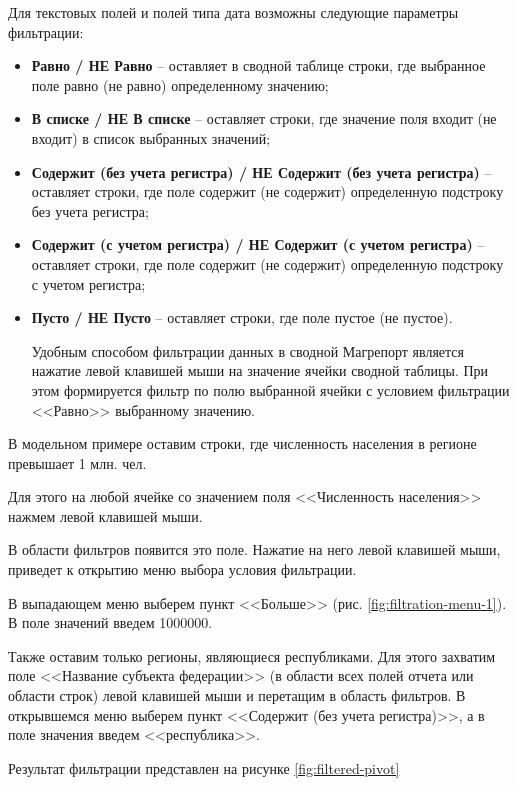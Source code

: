 \documentclass[../user-manual.tex]{subfiles}
\begin{document}
	Для текстовых полей и полей типа дата возможны следующие параметры фильтрации:
	
	\begin{itemize}
		
		\item \textbf{Равно / НЕ Равно} -- оставляет в сводной таблице строки, где выбранное поле равно (не равно) определенному значению;
		
		\item \textbf{В списке / НЕ В списке} -- оставляет строки, где значение поля входит (не входит) в список выбранных значений;
		
		\item \textbf{Содержит (без учета регистра) / НЕ Содержит (без учета регистра)} -- оставляет строки, где поле содержит (не содержит) определенную подстроку без учета регистра;
		
		\item \textbf{Содержит (с учетом регистра) / НЕ Содержит (с учетом регистра)} -- оставляет строки, где поле содержит (не содержит) определенную подстроку с учетом регистра;
		
		\item \textbf{Пусто / НЕ Пусто} -- оставляет строки, где поле пустое (не пустое).
		
	Удобным способом фильтрации данных в сводной Магрепорт является нажатие левой клавишей мыши на значение ячейки сводной таблицы. При этом формируется фильтр по полю выбранной ячейки с условием фильтрации <<Равно>> выбранному значению.
		
	\end{itemize}

	\begin{modelExample}
		В модельном примере оставим строки, где численность населения в регионе превышает 1 млн. чел.
	
		Для этого на любой ячейке со значением поля <<Численность населения>> нажмем левой клавишей мыши.
	
		В области фильтров появится это поле. Нажатие на него левой клавишей мыши, приведет к открытию меню выбора условия фильтрации.
	
		В выпадающем меню выберем пункт <<Больше>> (рис. \ref{fig:filtration-menu-1}). В поле значений введем 1000000.
	
		Также оставим только регионы, являющиеся республиками. Для этого захватим поле <<Название субъекта федерации>> (в области всех полей отчета или области строк) левой клавишей мыши и перетащим в область фильтров. В открывшемся меню выберем пункт <<Содержит (без учета регистра)>>, а в поле значения введем <<республика>>.

		Результат фильтрации представлен на рисунке \ref{fig:filtered-pivot}
	\end{modelExample}
\end{document}
